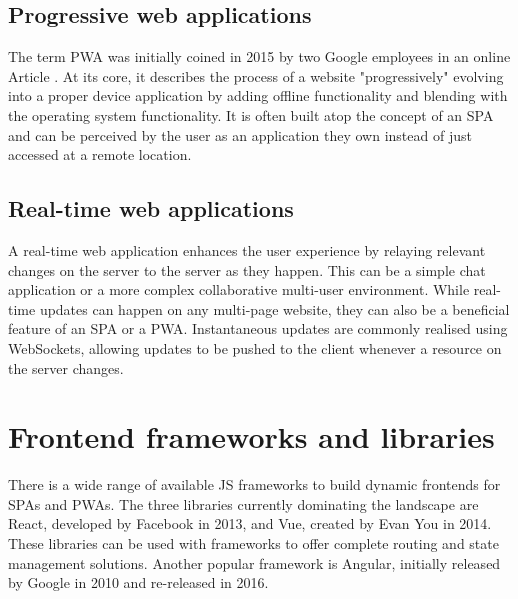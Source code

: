 \subsection{Progressive web applications}

The term \ac{PWA} was initially coined in 2015 by two Google employees in an online Article \parencite{progressiveWebApplications}. At its core, it describes the process of a website "progressively" evolving into a proper device application by adding offline functionality and blending with the operating system functionality. It is often built atop the concept of an \ac{SPA} and can be perceived by the user as an application they own instead of just accessed at a remote location.

\subsection{Real-time web applications}

A real-time web application enhances the user experience by relaying relevant changes on the server to the server as they happen. This can be a simple chat application or a more complex collaborative multi-user environment. While real-time updates can happen on any multi-page website, they can also be a beneficial feature of an \ac{SPA} or a \ac{PWA}. Instantaneous updates are commonly realised using WebSockets, allowing updates to be pushed to the client whenever a resource on the server changes.



\section{Frontend frameworks and libraries}

There is a wide range of available \ac{JS} frameworks to build dynamic frontends for \ac{SPA}s and \ac{PWA}s. The three libraries currently dominating the landscape are React, developed by Facebook in 2013, and Vue, created by Evan You in 2014. These libraries can be used with frameworks to offer complete routing and state management solutions. Another popular framework is Angular, initially released by Google in 2010 and re-released in 2016.

